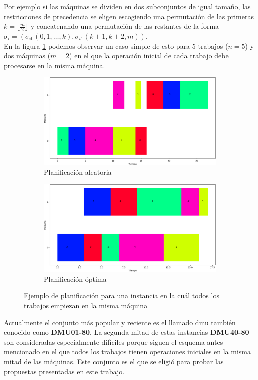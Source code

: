 %
Por ejemplo si las máquinas se dividen en dos subconjuntos de igual tamaño, las restricciones de precedencia se eligen escogiendo una permutación de las primeras $k = \lfloor\frac{m}{2}\rfloor$ y concatenando una permutación de las restantes de la forma $\sigma_i = (\sigma_{i0}(0,1,\dots,k),\sigma_{i1}(k+1,k+2,m))$.\\
%
En la figura \ref{fig:bottleneck} podemos observar un caso simple de esto para 5 trabajos ($n=5$) y dos máquinas ($m=2$) en el que la operación inicial de cada trabajo debe procesarse en la misma máquina.\\
%
\begin{figure}[h]
\begin{subfigure}{\textwidth}
    \centering
    \includegraphics[scale=.5]{Imagenes/casoextremomalo.png}
    \caption{Planificación aleatoria}
\end{subfigure}
\begin{subfigure}{\textwidth}
    \centering
    \includegraphics[scale=.5]{Imagenes/casoextremobueno.png}
    \caption{Planificación óptima}
\end{subfigure}
\caption{Ejemplo de planificación para una instancia en la cuál todos los trabajos empiezan en la misma máquina}
\label{fig:bottleneck}
\end{figure}

%
Actualmente el conjunto más popular y reciente es el llamado dmu\cite{demirkol1998benchmarks} también conocido como \textbf{DMU01-80}. La segunda mitad de estas instancias \textbf{DMU40-80} son consideradas especialmente difíciles porque siguen el esquema antes mencionado en el que todos los trabajos tienen operaciones iniciales en la misma mitad de las máquinas. Este conjunto es el que se eligió para probar las propuestas presentadas en este trabajo.

